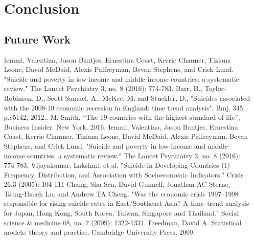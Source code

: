 \documentclass[conference]{IEEEtran}
\begin{document}
\section{Conclusion}

\subsection{Future Work}

\begin{thebibliography}{00}
Iemmi, Valentina, Jason Bantjes, Ernestina Coast, Kerrie Channer, Tiziana Leone, David McDaid, Alexis Palfreyman, Bevan Stephens, and Crick Lund. "Suicide and poverty in low-income and middle-income countries: a systematic review." The Lancet Psychiatry 3, no. 8 (2016): 774-783.
 Barr, B., Taylor-Robinson, D., Scott-Samuel, A., McKee, M. and Stuckler, D., "Suicides associated with the 2008-10 economic recession in England: time trend analysis". Bmj, 345, p.e5142, 2012..
 M. Smith, ``The 19 countries with the highest standard of life'', Business Insider. New York, 2016.
 Iemmi, Valentina, Jason Bantjes, Ernestina Coast, Kerrie Channer, Tiziana Leone, David McDaid, Alexis Palfreyman, Bevan Stephens, and Crick Lund. "Suicide and poverty in low-income and middle-income countries: a systematic review." The Lancet Psychiatry 3, no. 8 (2016): 774-783.
 Vijayakumar, Lakshmi, et al. "Suicide in Developing Countries (1) Frequency, Distribution, and Association with Socioeconomic Indicators." Crisis 26.3 (2005): 104-111
 Chang, Shu-Sen, David Gunnell, Jonathan AC Sterne, Tsung-Hsueh Lu, and Andrew TA Cheng. "Was the economic crisis 1997–1998 responsible for rising suicide rates in East/Southeast Asia? A time–trend analysis for Japan, Hong Kong, South Korea, Taiwan, Singapore and Thailand." Social science \& medicine 68, no. 7 (2009): 1322-1331.
Freedman, David A. Statistical models: theory and practice. Cambridge University Press, 2009.
\end{thebibliography}
\vspace{12pt}
\end{document}
